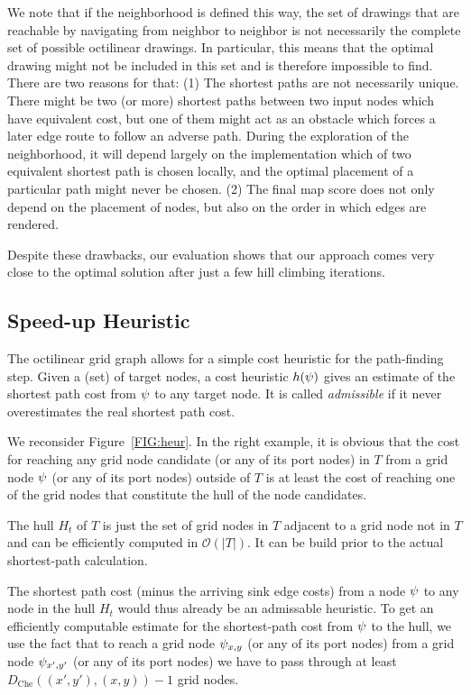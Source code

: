 \documentclass{sig-alternate-sigmod09}
\begin{document}
We note that if the neighborhood is defined this way, the set of drawings that are reachable by navigating from neighbor to neighbor is not necessarily the complete set of possible octilinear drawings.
In particular, this means that the optimal drawing might not be included in this set and is therefore impossible to find.
There are two reasons for that: 
(1) The shortest paths are not necessarily unique.
There might be two (or more) shortest paths between two input nodes which have equivalent cost, but one of them might act as an obstacle which forces a later edge route to follow an adverse path.
During the exploration of the neighborhood, it will depend largely on the implementation which of two equivalent shortest path is chosen locally, and the optimal placement of a particular path might never be chosen.
(2) The final map score does not only depend on the placement of nodes, but also on the order in which edges are rendered.

Despite these drawbacks, our evaluation shows that our approach comes very close to the optimal solution after just a few hill climbing iterations.

\subsection{Speed-up Heuristic}

The octilinear grid graph allows for a simple cost heuristic for the path-finding step.
Given a (set) of target nodes, a cost heuristic $h(\psi)$ gives an estimate of the shortest path cost from $\psi$ to any target node.
It is called \emph{admissible} if it never overestimates the real shortest path cost.

We reconsider Figure~\ref{FIG:heur}.
In the right example, it is obvious that the cost for reaching any grid node candidate (or any of its port nodes) in $T$ from a grid node $\psi$ (or any of its port nodes) outside of $T$ is at least the cost of reaching one of the grid nodes that constitute the hull of the node candidates.

The hull $H_t$ of $T$ is just the set of grid nodes in $T$ adjacent to a grid node not in $T$ and can be efficiently computed in $\mathcal{O}(|T|)$.
It can be build prior to the actual shortest-path calculation.

The shortest path cost (minus the arriving sink edge costs) from a node $\psi$ to any node in the hull $H_t$ would thus already be an admissable heuristic.
To get an efficiently computable estimate for the shortest-path cost from $\psi$ to the hull, we use the fact that to reach a grid node $\psi_{x, y}$ (or any of its port nodes) from a grid node $\psi_{x', y'}$ (or any of its port nodes) we have to pass through at least $D_{\text{Che}}((x', y'), (x, y)) - 1$ grid nodes.
\end{document}
